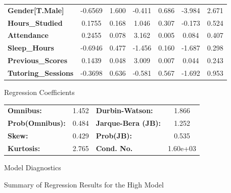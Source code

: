 \documentclass[twocolumn]{article} %
\begin{document}
\begin{figure}[ht]
\begin{subtable}{\textwidth}
\begin{tabular}{lcccccc}
      \textbf{Gender[T.Male]}                             &      -0.6569  &        1.600     &    -0.411  &         0.686        &       -3.984    &        2.671     \\
      \textbf{Hours\_Studied}                             &       0.1755  &        0.168     &     1.046  &         0.307        &       -0.173    &        0.524     \\
      \textbf{Attendance}                                 &       0.2455  &        0.078     &     3.162  &         0.005        &        0.084    &        0.407     \\
      \textbf{Sleep\_Hours}                               &      -0.6946  &        0.477     &    -1.456  &         0.160        &       -1.687    &        0.298     \\
      \textbf{Previous\_Scores}                           &       0.1439  &        0.048     &     3.009  &         0.007        &        0.044    &        0.243     \\
      \textbf{Tutoring\_Sessions}                         &      -0.3698  &        0.636     &    -0.581  &         0.567        &       -1.692    &        0.953     \\
      \bottomrule
    \end{tabular}
    \caption{Regression Coefficients}
    \label{tab:regression_coefficients-high}
  \end{subtable}

  \vspace{1em} %

  \begin{subtable}{\textwidth}
    \centering
    \begin{tabular}{lclc}
      \textbf{Omnibus:}       &  1.452 & \textbf{  Durbin-Watson:     } &    1.866  \\
      \textbf{Prob(Omnibus):} &  0.484 & \textbf{  Jarque-Bera (JB):  } &    1.252  \\
      \textbf{Skew:}          &  0.429 & \textbf{  Prob(JB):          } &    0.535  \\
      \textbf{Kurtosis:}      &  2.765 & \textbf{  Cond. No.          } & 1.60e+03  \\
      \bottomrule
      \end{tabular}
    \caption{Model Diagnostics}
    \label{tab:model_diagnostics-high}
  \end{subtable}

  \caption{Summary of Regression Results for the High Model}
  \label{fig:high-model-summary}
\end{figure}
\end{document}
